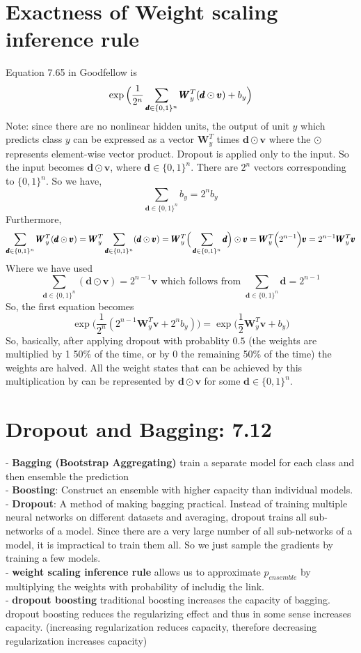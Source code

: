 \documentclass{article}
\newcommand{\beq}{\begin{equation}}
\newcommand{\eeq}{\end{equation}}
\begin{document}
\section{Exactness of Weight scaling inference rule}
Equation 7.65 in Goodfellow is
\beq
\exp\Big{(}\frac{1}{2^n}\sum_{\pmb{d}\in\{0,1\}^n}\pmb{W}_{y}^T(\pmb{d}\odot\pmb{v})+b_y\Big{)}
\eeq
Note: since there are no nonlinear hidden units, the output of unit $y$ which predicts class $y$ can be expressed as a vector $\pmb{W}_{y}^T$ times $\pmb{d}\odot\pmb{v}$ where the $\odot$ represents element-wise vector product. Dropout is applied only to the input. So the input becomes $\pmb{d}\odot\pmb{v}$, where $\pmb{d}\in\{0,1\}^n$. There are $2^n$ vectors corresponding to $\{0,1\}^n$. So we have,
\beq
\sum_{\pmb{d}\in\{0,1\}^n} b_y  = 2^nb_y
\eeq
Furthermore,
\beq
\sum_{\pmb{d}\in\{0,1\}^n}\pmb{W}_{y}^T(\pmb{d}\odot\pmb{v}) = \pmb{W}_{y}^T\sum_{\pmb{d}\in\{0,1\}^n}(\pmb{d}\odot\pmb{v})
= \pmb{W}_{y}^T\Big{(}\sum_{\pmb{d}\in\{0,1\}^n}\pmb{d}\Big{)}\odot\pmb{v}
= \pmb{W}_{y}^T\Big{(}2^{n-1}\Big{)}\pmb{v} = 2^{n-1}\pmb{W}_{y}^T\pmb{v}
\eeq
Where we have used
\beq
\sum_{\pmb{d}\in\{0,1\}^n}(\pmb{d}\odot\pmb{v}) = 2^{n-1}\pmb{v} \text{ which follows from }\sum_{\pmb{d}\in\{0,1\}^n}{\pmb{d}}=2^{n-1}
\eeq
So, the first equation becomes
\beq
\exp\Big(\frac{1}{2^n}(2^{n-1}\pmb{W}_{y}^T\pmb{v}+2^nb_y)\Big) = \exp\Big(\frac{1}{2}\pmb{W}_{y}^T\pmb{v}+b_y\Big) 
\eeq
So, basically, after applying dropout with probablity $0.5$ (the weights are multiplied by 1 50\% of the time, or by 0 the remaining 50\% of the time) the weights are halved. All the weight states that can be achieved by this multiplication by can be represented by $\pmb{d}\odot\pmb{v}$ for some $\pmb{d}\in\{0,1\}^n$.
%
%
%
\section{Dropout and Bagging: 7.12 }
- \textbf{Bagging (Bootstrap Aggregating)} train a separate model for each class and then ensemble the prediction\\
- \textbf{Boosting}: Construct an ensemble with higher capacity than individual models.\\
- \textbf{Dropout}: A method of making bagging practical. Instead of training multiple neural networks on different datasets and averaging, dropout trains all sub-networks of a model. Since there are a very large number of all sub-networks of a model, it is impractical to train them all. So we just sample the gradients by training a few models.\\
- \textbf{weight scaling inference rule} allows us to approximate $p_{ensemble}$ by multiplying the weights with probability of includig the link.\\
- \textbf{dropout boosting} traditional boosting increases the capacity of bagging. dropout boosting reduces the regularizing effect and thus in some sense increases capacity. (increasing regularization reduces capacity, therefore decreasing regularization increases capacity)
%
%
%
\end{document}
